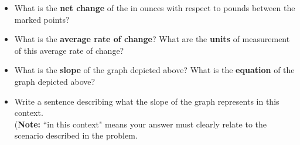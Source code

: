 \documentclass[10pt]{article}
\begin{document}
\begin{center}
\end{center}

    \begin{itemize}
    
    \item[(a)] What is the {\bf net change} of the in ounces with respect to pounds between the marked points?
    
    \item[(b)] What is the {\bf average rate of change}? What are the {\bf units} of measurement of this average rate of change? 
    
    \item[(c)] What is the {\bf slope} of the graph depicted above? What is the {\bf equation} of the graph depicted above?
    
    \item[(d)] Write a sentence describing what the slope of the graph represents in this context.\\ 
    ({\bf Note:} ``in this context" means your answer must clearly relate to the scenario described in the problem.
    \end{itemize}
\end{document}
